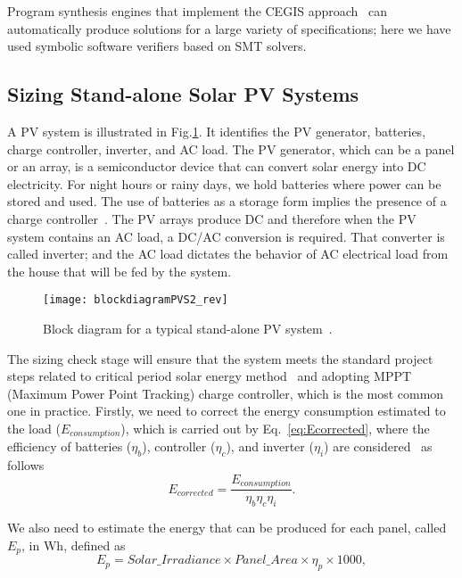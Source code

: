 Program synthesis engines that implement the CEGIS approach~\cite{sketch} can automatically produce solutions for a large variety of specifications; here we have used symbolic software verifiers based on SMT solvers.

\subsection{Sizing Stand-alone Solar PV Systems}
\label{sec:sizing}

A PV system is illustrated in Fig.\ref{fig:blockdiagram}. It identifies the PV generator, batteries, charge controller, inverter, and AC load. 
The PV generator, which can be a panel or an array, is a semiconductor device that can convert solar energy into DC electricity.  
For night hours or rainy days, we hold batteries where power can be stored and used. The use of batteries as a storage 
form implies the presence of a charge controller~\cite{Hansen}. The PV arrays produce DC and therefore when the PV system 
contains an AC load, a DC/AC conversion is required. That converter is called inverter; and the AC load dictates the behavior 
of AC electrical load from the house that will be fed by the system.
%
\begin{figure}[h]
\texttt{[image: blockdiagramPVS2\_rev]}
\centering
\caption{Block diagram for a typical stand-alone PV system~\cite{Hansen}.}
\label{fig:blockdiagram} 
\end{figure}

The sizing check stage will ensure that the system meets the standard project steps related 
to critical period solar energy method~\cite{Pinho} and adopting MPPT (Maximum Power Point Tracking) charge controller,
which is the most common one in practice. Firstly, we need to correct the energy consumption estimated to the load 
($E_{consumption}$), which is carried out by Eq.~\eqref{eq:Ecorrected}, where the efficiency of batteries ($\eta_{b}$), 
controller ($\eta_{c}$), and inverter ($\eta_{i}$) are considered~\cite{Pinho} as follows
%
\begin{equation}
\label{eq:Ecorrected}
E_{corrected} = \dfrac{E_{consumption}}{\eta_{b} \eta_{c} \eta_{i} }.
\end{equation}

We also need to estimate the energy that can be produced for each panel, called $E_{p}$, in Wh, defined as
%
\begin{equation}
\label{eq:Ep}
E_{p} = Solar\_Irradiance \times Panel\_Area \times \eta_{p} \times 1000,
\end{equation}

